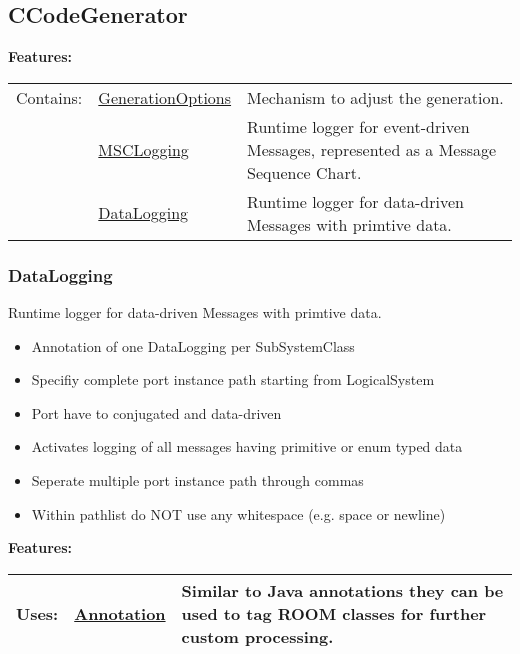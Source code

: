 \subsection{CCodeGenerator}
	\hypertarget{ref:CCodeGenerator}{}
		
		
		
	\begingroup
	\textbf{Features:}
	\renewcommand{\arraystretch}{1.8} %
	\begin{longtable}{l|l p{}}
		\hline
	Contains: & \tabitem \hyperlink{ref:GenerationOptions}{GenerationOptions}  & Mechanism to adjust the generation.\\
	& \tabitem \hyperlink{ref:MSCLogging}{MSCLogging}  & Runtime logger for event-driven Messages, represented as a Message Sequence Chart. \\
	& \tabitem \hyperlink{ref:DataLogging}{DataLogging}  & Runtime logger for data-driven Messages with primtive data. \\
	\hline
	\end{longtable}
	\endgroup
		
		
	
	\vspace{\baselineskip}
	\vspace{\baselineskip}
	\vspace{\baselineskip}
	
\subsubsection{DataLogging}
	\hypertarget{ref:DataLogging}{}
	Runtime logger for data-driven Messages with primtive data.
		
	 \begin{itemize}
		\item Annotation of one \textsf{DataLogging} per SubSystemClass
		\item Specifiy complete port instance path starting from LogicalSystem
		\item Port have to conjugated and data-driven
		\item Activates logging of all messages having primitive or enum typed data
		\item Seperate multiple port instance path through commas
		\item Within \textsf{pathlist} do NOT use any whitespace (e.g. space or newline)
	\end{itemize}
		
		
	\begingroup
	\textbf{Features:}
	\renewcommand{\arraystretch}{1.8} %
	\begin{longtable}{l|l p{}}
		\hline
	Uses: & \tabitem \hyperlink{ref:Annotation}{Annotation}  & Similar to Java annotations they can be used to tag ROOM classes for further custom processing.\\
	\hline
	\end{longtable}
	\endgroup
		
